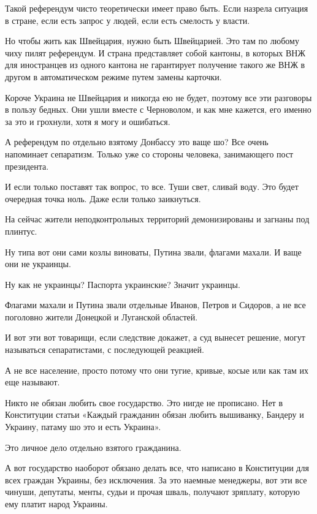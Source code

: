 \begin{multicols}{2} %
\setlength{\parindent}{0pt}

Такой референдум чисто теоретически имеет право быть. Если назрела ситуация в
стране, если есть запрос у людей, если есть смелость у власти.

Но чтобы жить как Швейцария, нужно быть Швейцарией. Это там по любому чиху
пилят референдум. И страна представляет собой кантоны, в которых ВНЖ для
иностранцев из одного кантона не гарантирует получение такого же ВНЖ в другом в
автоматическом режиме путем замены карточки.

Короче Украина не Швейцария и никогда ею не будет, поэтому все эти разговоры в
пользу бедных. Они ушли вместе с Черноволом, и как мне кажется, его именно за
это и грохнули, хотя я могу и ошибаться.

А референдум по отдельно взятому Донбассу это ваще шо? Все очень напоминает
сепаратизм. Только уже со стороны человека, занимающего пост президента.

И если только поставят так вопрос, то все. Туши свет, сливай воду. Это будет
очередная точка ноль. Даже если только заикнуться.

На сейчас жители неподконтрольных территорий демонизированы и загнаны под
плинтус.

Ну типа вот они сами козлы виноваты, Путина звали, флагами махали. И ваще они
не украинцы.

Ну как не украинцы? Паспорта украинские? Значит украинцы.

Флагами махали и Путина звали отдельные Иванов, Петров и Сидоров, а не все
поголовно жители Донецкой и Луганской областей.

И вот эти вот товарищи, если следствие докажет, а суд вынесет решение, могут
называться сепаратистами, с последующей реакцией.

А не все население, просто потому что они тугие, кривые, косые или как там их
еще называют.

Никто не обязан любить свое государство. Это нигде не прописано. Нет в
Конституции статьи «Каждый гражданин обязан любить вышиванку, Бандеру и
Украину, патаму шо это и есть Украина».

Это личное дело отдельно взятого гражданина.

А вот государство наоборот обязано делать все, что написано в Конституции для
всех граждан Украины, без исключения. За это наемные менеджеры, вот эти все
чинуши, депутаты, менты, судьи и прочая шваль, получают зряплату, которую ему
платит народ Украины.


\end{multicols}
